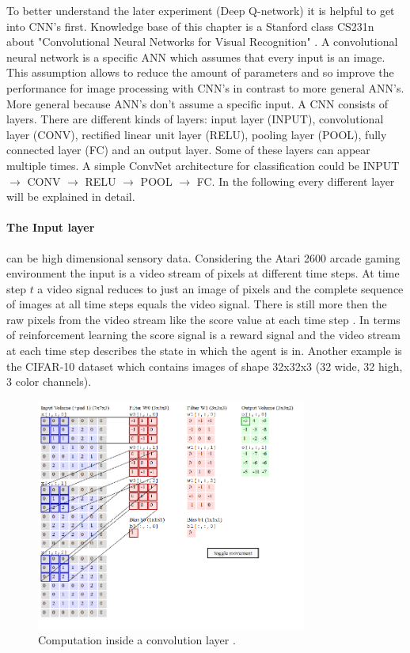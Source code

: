 \documentclass[conference]{IEEEtran}
\begin{document}
To better understand the later experiment \cite{mnih-atari-2013} (Deep Q-network) it is helpful to get into CNN's first. Knowledge base of this chapter is a Stanford class CS231n about "Convolutional Neural Networks for Visual Recognition" \cite{KarpathyCNN}. A convolutional neural network is a specific ANN which assumes that every input is an image. This assumption allows to reduce the amount of parameters and so improve the performance for image processing with CNN's in contrast to more general ANN's. More general because ANN's don't assume a specific input. A CNN consists of layers. There are different kinds of layers: input layer (INPUT), convolutional layer (CONV), rectified linear unit layer (RELU), pooling layer (POOL), fully connected layer (FC) and an output layer. Some of these layers can appear multiple times. A simple ConvNet architecture for classification could be INPUT $\rightarrow$ CONV $\rightarrow$ RELU $\rightarrow$ POOL $\rightarrow$ FC. In the following every different layer will be explained in detail.

\paragraph{The Input layer} can be high dimensional sensory data. Considering the Atari 2600 arcade gaming environment \cite{DBLP:journals/corr/MnihBMGLHSK16, DBLP:journals/corr/HasseltGS15, DRL:HumanLevelControl} the input is a video stream of pixels at different time steps. At time step $t$ a video signal reduces to just an image of pixels and the complete sequence of images at all time steps equals the video signal. There is still more then the raw pixels from the video stream like the score value at each time step \cite{DRL:HumanLevelControl}. In terms of reinforcement learning the score signal is a reward signal and the video stream at each time step describes the state in which the agent is in. Another example is the CIFAR-10 dataset which contains images of shape 32x32x3 (32 wide, 32 high, 3 color channels).

\begin{figure}[!t]
\centering
\includegraphics[width=3.5in]{convolutional_layer}
\caption{Computation inside a convolution layer \cite{KarpathyCNN}.}
\label{fig:convolutional_layer}
\end{figure}
\end{document}

